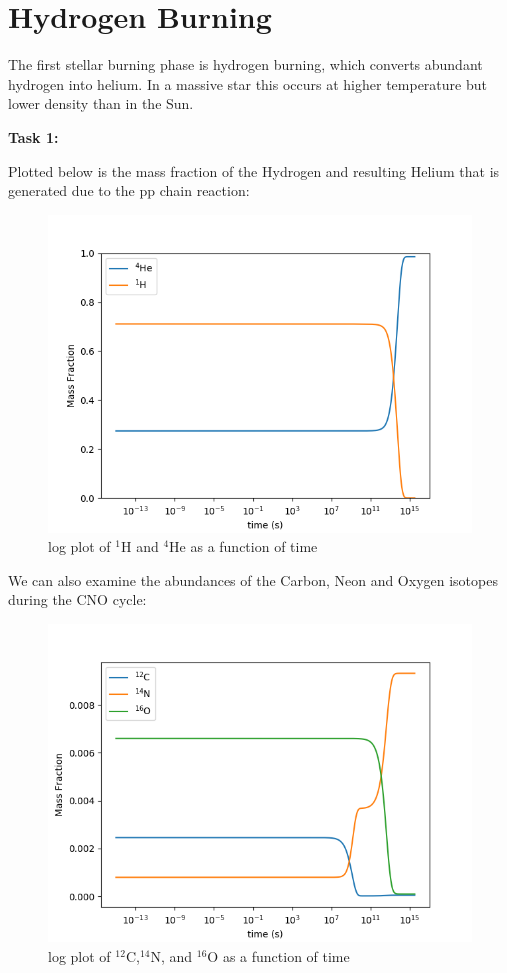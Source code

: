 \documentclass[manuscript]{aastex62}
\begin{document}
\section{Hydrogen Burning} \label{sec:H}

The first stellar burning phase is hydrogen burning, which converts
abundant hydrogen into helium.  In a massive star
this occurs at higher temperature but lower density than in the Sun.

{\bf Task 1:}


Plotted below is the mass fraction of the Hydrogen and resulting Helium that is generated due to the pp chain reaction:

\begin{figure}[h]
\includegraphics[scale=0.7]{task1}
\caption{log plot of $^1$H and $^4$He as a function of time}
\end{figure}

We can also examine the abundances of the Carbon, Neon and Oxygen isotopes during the CNO cycle:

\begin{figure}[h]
\includegraphics[scale=0.7]{task1_1}
\caption{log plot of $^{12}$C,$^{14}$N, and $^{16}$O as a function of time}
\end{figure}
\end{document}
